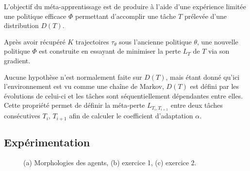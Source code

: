 \documentclass[a4paper,11pt]{article}
\begin{document}
    L'objectif du méta-apprentissage est de produire à l'aide d'une expérience 
    limitée une politique efficace $\Phi$ permettant d'accomplir une tâche $T$ prélevée 
    d'une distribution $D(T)$. 
    
    Après avoir récupéré $K$ trajectoires $\tau_\theta$ sous l'ancienne politique $\theta$, 
    une nouvelle politique $\Phi$ est construite en essayant de minimiser la perte $L_T$ de $T$ via son gradient.
  
    Aucune hypothèse n'est normalement faite sur $D(T)$, mais étant donné qu'ici l'environnement
    est vu comme une chaîne de Markov, $D(T)$ est défini par les évolutions de celui-ci et 
    les tâches sont séquentiellement dépendantes entre elles. Cette propriété permet de définir 
    la méta-perte $L_{T_i, T_{i+1}}$ entre deux tâches consécutives $T_i$, $T_{i+1}$ afin de calculer 
    le coefficient d'adaptation $\alpha$. 
    
    \subsection{Expérimentation}
    \vspace{-1em}

    \begin{figure}[h]
      \centering
      \caption{(a) Morphologies des agents, (b) exercice 1, (c) exercice 2.}
      \label{about}
    \end{figure}
\end{document}
